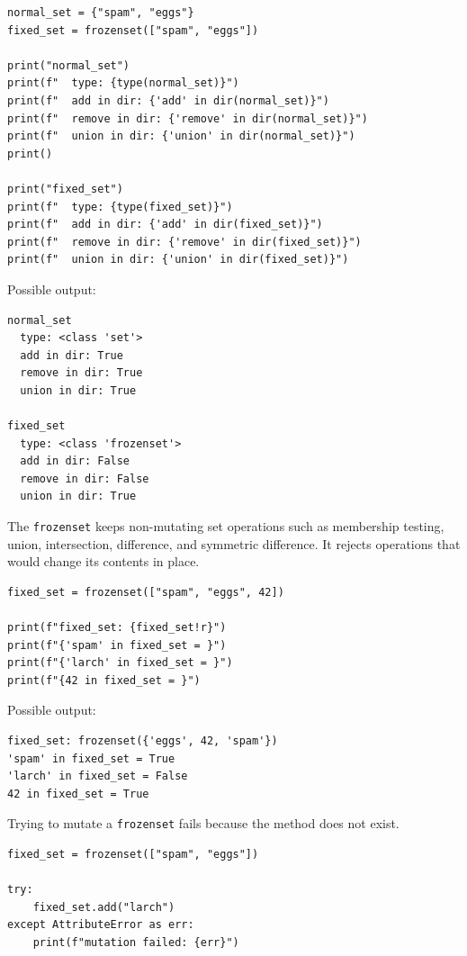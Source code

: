 \begin{verbatim}
normal_set = {"spam", "eggs"}
fixed_set = frozenset(["spam", "eggs"])

print("normal_set")
print(f"  type: {type(normal_set)}")
print(f"  add in dir: {'add' in dir(normal_set)}")
print(f"  remove in dir: {'remove' in dir(normal_set)}")
print(f"  union in dir: {'union' in dir(normal_set)}")
print()

print("fixed_set")
print(f"  type: {type(fixed_set)}")
print(f"  add in dir: {'add' in dir(fixed_set)}")
print(f"  remove in dir: {'remove' in dir(fixed_set)}")
print(f"  union in dir: {'union' in dir(fixed_set)}")
\end{verbatim}

Possible output:

\begin{verbatim}
normal_set
  type: <class 'set'>
  add in dir: True
  remove in dir: True
  union in dir: True

fixed_set
  type: <class 'frozenset'>
  add in dir: False
  remove in dir: False
  union in dir: True
\end{verbatim}

The \texttt{frozenset} keeps non-mutating set operations such as membership testing, union, intersection, difference, and symmetric difference. It rejects operations that would change its contents in place.

\begin{verbatim}
fixed_set = frozenset(["spam", "eggs", 42])

print(f"fixed_set: {fixed_set!r}")
print(f"{'spam' in fixed_set = }")
print(f"{'larch' in fixed_set = }")
print(f"{42 in fixed_set = }")
\end{verbatim}

Possible output:

\begin{verbatim}
fixed_set: frozenset({'eggs', 42, 'spam'})
'spam' in fixed_set = True
'larch' in fixed_set = False
42 in fixed_set = True
\end{verbatim}

Trying to mutate a \texttt{frozenset} fails because the method does not exist.

\begin{verbatim}
fixed_set = frozenset(["spam", "eggs"])

try:
    fixed_set.add("larch")
except AttributeError as err:
    print(f"mutation failed: {err}")
\end{verbatim}

